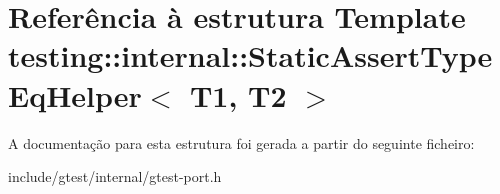 \hypertarget{structtesting_1_1internal_1_1StaticAssertTypeEqHelper}{\section{Referência à estrutura Template testing\-:\-:internal\-:\-:Static\-Assert\-Type\-Eq\-Helper$<$ T1, T2 $>$}
\label{structtesting_1_1internal_1_1StaticAssertTypeEqHelper}
}


A documentação para esta estrutura foi gerada a partir do seguinte ficheiro\-:\begin{DoxyCompactItemize}
\item 
include/gtest/internal/gtest-\/port.\-h\end{DoxyCompactItemize}
